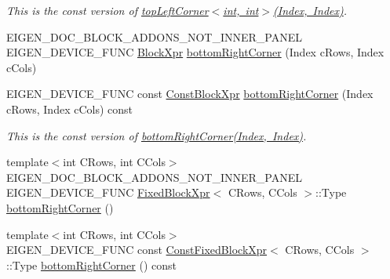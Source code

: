 \begin{DoxyCompactItemize}
\begin{DoxyCompactList}\small\item\em This is the const version of \mbox{\hyperlink{class_eigen_1_1_dense_base_a5fe4cee91037d9586f72bafa5fdd4bd2}{top\+Left\+Corner$<$int, int$>$(\+Index, Index)}}. \end{DoxyCompactList}\item 
E\+I\+G\+E\+N\+\_\+\+D\+O\+C\+\_\+\+B\+L\+O\+C\+K\+\_\+\+A\+D\+D\+O\+N\+S\+\_\+\+N\+O\+T\+\_\+\+I\+N\+N\+E\+R\+\_\+\+P\+A\+N\+EL E\+I\+G\+E\+N\+\_\+\+D\+E\+V\+I\+C\+E\+\_\+\+F\+U\+NC \mbox{\hyperlink{class_eigen_1_1_block}{Block\+Xpr}} \mbox{\hyperlink{class_eigen_1_1_dense_base_a6cdf27f6b825097f86fc6bcdbeed9e65}{bottom\+Right\+Corner}} (Index c\+Rows, Index c\+Cols)
\item 
\mbox{\label{class_eigen_1_1_dense_base_a805284f5f60a6deefb5b1892d02b0f9e}} 
E\+I\+G\+E\+N\+\_\+\+D\+E\+V\+I\+C\+E\+\_\+\+F\+U\+NC const \mbox{\hyperlink{class_eigen_1_1_block}{Const\+Block\+Xpr}} \mbox{\hyperlink{class_eigen_1_1_dense_base_a805284f5f60a6deefb5b1892d02b0f9e}{bottom\+Right\+Corner}} (Index c\+Rows, Index c\+Cols) const
\begin{DoxyCompactList}\small\item\em This is the const version of \mbox{\hyperlink{class_eigen_1_1_dense_base_a6cdf27f6b825097f86fc6bcdbeed9e65}{bottom\+Right\+Corner(\+Index, Index)}}. \end{DoxyCompactList}\item 
{\footnotesize template$<$int C\+Rows, int C\+Cols$>$ }\\E\+I\+G\+E\+N\+\_\+\+D\+O\+C\+\_\+\+B\+L\+O\+C\+K\+\_\+\+A\+D\+D\+O\+N\+S\+\_\+\+N\+O\+T\+\_\+\+I\+N\+N\+E\+R\+\_\+\+P\+A\+N\+EL E\+I\+G\+E\+N\+\_\+\+D\+E\+V\+I\+C\+E\+\_\+\+F\+U\+NC \mbox{\hyperlink{struct_eigen_1_1_dense_base_1_1_fixed_block_xpr}{Fixed\+Block\+Xpr}}$<$ C\+Rows, C\+Cols $>$\+::Type \mbox{\hyperlink{class_eigen_1_1_dense_base_a0ec93fbbf57f19fd6253fe1bef9a960c}{bottom\+Right\+Corner}} ()
\item 
\mbox{\label{class_eigen_1_1_dense_base_a17870bf03c6c431415882b214c244d0a}} 
{\footnotesize template$<$int C\+Rows, int C\+Cols$>$ }\\E\+I\+G\+E\+N\+\_\+\+D\+E\+V\+I\+C\+E\+\_\+\+F\+U\+NC const \mbox{\hyperlink{struct_eigen_1_1_dense_base_1_1_const_fixed_block_xpr}{Const\+Fixed\+Block\+Xpr}}$<$ C\+Rows, C\+Cols $>$\+::Type \mbox{\hyperlink{class_eigen_1_1_dense_base_a17870bf03c6c431415882b214c244d0a}{bottom\+Right\+Corner}} () const

\end{DoxyCompactItemize}
